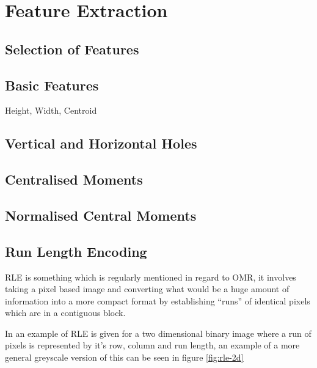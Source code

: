 \section{Feature Extraction}

\subsection{Selection of Features}

\subsection{Basic Features}
Height, Width, Centroid

\subsection{Vertical and Horizontal Holes}

\subsection{Centralised Moments}

\subsection{Normalised Central Moments}

\subsection{Run Length Encoding}
\label{sec:tb-rle}

\acrfull{RLE} is something which is regularly mentioned in regard to OMR, it involves taking a pixel based image and converting what would be a huge amount of information into a more compact format by establishing ``runs'' of identical pixels which are in a contiguous block.

In \cite{burger2009principles} an example of RLE is given for a two dimensional binary image where a run of pixels is represented by it's row, column and run length, an example of a more general greyscale version of this can be seen in figure \ref{fig:rle-2d}

